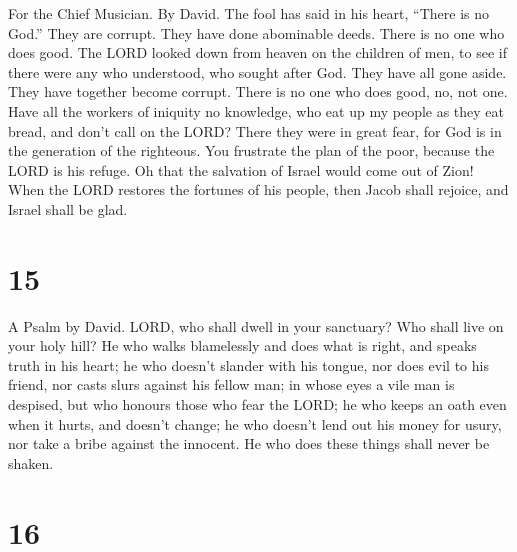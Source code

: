 For the Chief Musician. By David.  The fool has said in
his heart, ``There is no God.'' They are corrupt. They have done
abominable deeds. There is no one who does good.  The LORD
looked down from heaven on the children of men, to see if there were any
who understood, who sought after God.  They have all gone
aside. They have together become corrupt. There is no one who does good,
no, not one.  Have all the workers of iniquity no
knowledge, who eat up my people as they eat bread, and don't call on the
LORD?  There they were in great fear, for God is in the
generation of the righteous.  You frustrate the plan of
the poor, because the LORD is his refuge.  Oh that the
salvation of Israel would come out of Zion! When the LORD restores the
fortunes of his people, then Jacob shall rejoice, and Israel shall be
glad.

\hypertarget{section-14}{%
\section{15}\label{section-14}}

A Psalm by David.  LORD, who shall dwell in your
sanctuary? Who shall live on your holy hill?  He who walks
blamelessly and does what is right, and speaks truth in his heart;
 he who doesn't slander with his tongue, nor does evil to
his friend, nor casts slurs against his fellow man;  in
whose eyes a vile man is despised, but who honours those who fear the
LORD; he who keeps an oath even when it hurts, and doesn't change;
 he who doesn't lend out his money for usury, nor take a
bribe against the innocent. He who does these things shall never be
shaken.

\hypertarget{section-15}{%
\section{16}\label{section-15}}

